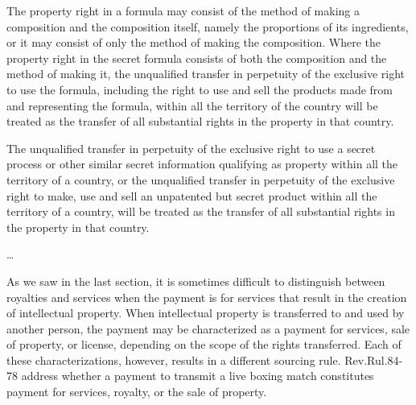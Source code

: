 \begin{select}
The property right in a formula may consist of the method of making a composition and the composition itself, namely the proportions of its ingredients, or it may consist of only the method of making the composition. Where the property right in the secret formula consists of both the composition and the method of making it, the unqualified transfer in perpetuity of the exclusive right to use the formula, including the right to use and sell the products made from and representing the formula, within all the territory of the country will be treated as the transfer of all substantial rights in the property in that country.

The unqualified transfer in perpetuity of the exclusive right to use a secret process or other similar secret information qualifying as property within all the territory of a country, or the unqualified transfer in perpetuity of the exclusive right to make, use and sell an unpatented but secret product within all the territory of a country, will be treated as the transfer of all substantial rights in the property in that country.

\ldots
\end{select}

As we saw in the last section, it is sometimes difficult to distinguish between royalties and services when the payment is for services that result in the creation of intellectual property.  When intellectual property is transferred to and used by another person, the payment may be characterized as a payment for services, sale of property, or license, depending on the scope of the rights transferred.  Each of these characterizations, however, results in a different sourcing rule.  Rev.\@\@ Rul.\@ 84-78 address whether a payment to transmit a live boxing match constitutes payment for services, royalty, or the sale of property.




